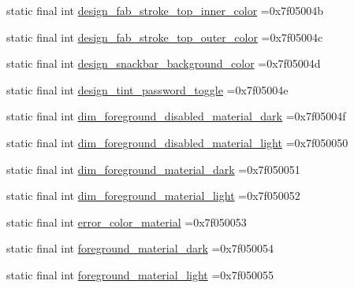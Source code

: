 \begin{DoxyCompactItemize}
\item 
static final int \mbox{\hyperlink{classbr_1_1unb_1_1cic_1_1mp_1_1marketmaster_1_1R_1_1color_a19a50ab3e6bd92748749c7cf0eecd0a6}{design\+\_\+fab\+\_\+stroke\+\_\+top\+\_\+inner\+\_\+color}} =0x7f05004b
\item 
static final int \mbox{\hyperlink{classbr_1_1unb_1_1cic_1_1mp_1_1marketmaster_1_1R_1_1color_a9216c5dca344b725e2d6a97bb40a8479}{design\+\_\+fab\+\_\+stroke\+\_\+top\+\_\+outer\+\_\+color}} =0x7f05004c
\item 
static final int \mbox{\hyperlink{classbr_1_1unb_1_1cic_1_1mp_1_1marketmaster_1_1R_1_1color_adb67a5f556ad07dc4f43cc37b60b2bdc}{design\+\_\+snackbar\+\_\+background\+\_\+color}} =0x7f05004d
\item 
static final int \mbox{\hyperlink{classbr_1_1unb_1_1cic_1_1mp_1_1marketmaster_1_1R_1_1color_a87bf0e15fa7afc87e74b5f93aea254eb}{design\+\_\+tint\+\_\+password\+\_\+toggle}} =0x7f05004e
\item 
static final int \mbox{\hyperlink{classbr_1_1unb_1_1cic_1_1mp_1_1marketmaster_1_1R_1_1color_a8f8e04b23c63a34f7aa5ad17f5dafb09}{dim\+\_\+foreground\+\_\+disabled\+\_\+material\+\_\+dark}} =0x7f05004f
\item 
static final int \mbox{\hyperlink{classbr_1_1unb_1_1cic_1_1mp_1_1marketmaster_1_1R_1_1color_a9163d3e85b47ed87dfefdf173c31e5ff}{dim\+\_\+foreground\+\_\+disabled\+\_\+material\+\_\+light}} =0x7f050050
\item 
static final int \mbox{\hyperlink{classbr_1_1unb_1_1cic_1_1mp_1_1marketmaster_1_1R_1_1color_a6bf85d04e4ccc2ee0352fdd9ba2c36b2}{dim\+\_\+foreground\+\_\+material\+\_\+dark}} =0x7f050051
\item 
static final int \mbox{\hyperlink{classbr_1_1unb_1_1cic_1_1mp_1_1marketmaster_1_1R_1_1color_a4d156df171b9b47ba9da12abb72d7869}{dim\+\_\+foreground\+\_\+material\+\_\+light}} =0x7f050052
\item 
static final int \mbox{\hyperlink{classbr_1_1unb_1_1cic_1_1mp_1_1marketmaster_1_1R_1_1color_a5460f57df4dd98e6b1a5abb9b24e5576}{error\+\_\+color\+\_\+material}} =0x7f050053
\item 
static final int \mbox{\hyperlink{classbr_1_1unb_1_1cic_1_1mp_1_1marketmaster_1_1R_1_1color_a853bb6ba861c16a942988dec5ec3abef}{foreground\+\_\+material\+\_\+dark}} =0x7f050054
\item 
static final int \mbox{\hyperlink{classbr_1_1unb_1_1cic_1_1mp_1_1marketmaster_1_1R_1_1color_ac23a70874776a2f7f01dca42fa30e5f2}{foreground\+\_\+material\+\_\+light}} =0x7f050055
\item 

\end{DoxyCompactItemize}
